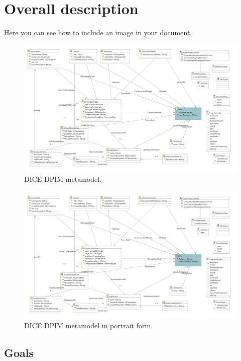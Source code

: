\section{Overall description}
\label{sect:overalldescription}

Here you can see how to include an image in your document.

\begin{figure}
\centering
\includegraphics[width=\textwidth]{Images/11.png}
\caption{\label{fig:metamodel}DICE DPIM metamodel.}
\end{figure}

\begin{figure}
\centering
\includegraphics[width=\textwidth]{Images/11.png}
\caption{\label{fig:metamodel2}DICE DPIM metamodel in portrait form.}
\end{figure}

\subsection{Goals}
\label{sect:goals}

